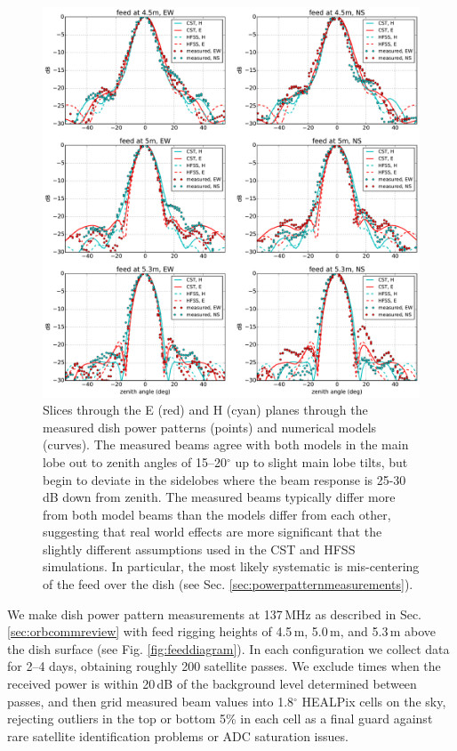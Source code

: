 \documentclass{emulateapj}
\begin{document}
\begin{figure}[t]
\centering
\includegraphics[width=6.5in]{measured_beams_and_models_slices.pdf}
\caption{Slices through the E (red) and H (cyan) planes through the measured dish power patterns (points) and numerical models (curves). The measured beams agree with both models in the main lobe out to zenith angles of 15--20$^\circ$ up to slight main lobe tilts, but begin to deviate in the sidelobes where the beam response is 25-30\,dB down from zenith. The measured beams typically differ more from both model beams than the models differ from each other, suggesting that real world effects are more significant that the slightly different assumptions used in the CST and HFSS simulations. In particular, the most likely systematic is mis-centering of the feed over the dish (see Sec. \ref{sec:powerpatternmeasurements}).}
\label{fig:measuredbeamslices}
\end{figure}

We make dish power pattern measurements at 137\,MHz as described in Sec. \ref{sec:orbcommreview} with feed rigging heights of 4.5\,m, 5.0\,m, and 5.3\,m above the dish surface (see Fig. \ref{fig:feeddiagram}). In each configuration we collect data for 2--4 days, obtaining roughly 200 satellite passes. We exclude times when the received power is within 20\,dB of the background level determined between passes, and then grid measured beam values into 1.8$^\circ$ HEALPix cells on the sky, rejecting outliers in the top or bottom 5\% in each cell as a final guard against rare satellite identification problems or ADC saturation issues.
\end{document}
